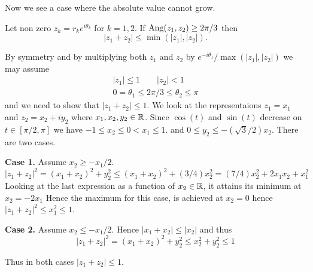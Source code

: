 Now we see a case where the absolute value cannot grow.
\begin{llem} \label{llem:z12:2pi3}
Let non zero \(z_k = r_k e^{i\theta_k}\) for \(k=1,2\).
If \(\mathop{\rm Ang}\nolimits(z_1,z_2) \geq 2\pi/3\) then
\begin{equation*}
|z_1 + z_2| \leq \min(|z_1|,|z_2|).
\end{equation*}
\end{llem}
\begin{thmproof}
By symmetry and by multiplying both \(z_1\) and \(z_2\) by 
\(e^{-i\theta_1}/\max(|z_1|,|z_2|)\)
we may assume 
\begin{gather*}
|z_1| \leq 1 \qquad |z_2| < 1 \\
0=\theta_1 \leq 2\pi/3 \leq \theta_2 \leq \pi
\end{gather*}
and we need to show that \(|z_1 + z_2| \leq 1\).
We look at the representaions \(z_1=x_1\) and \(z_2 = x_2 + iy_2\)
where \(x_1,x_2,y_2\in\mathbb{R}\).
Since \(\cos(t)\) and \(\sin(t)\) decrease on \(t\in[\pi/2,\pi]\)
we have 
\(-1 \leq x_2 \leq 0 < x_1 \leq 1\).
and
\(0\leq y_2 \leq -(\sqrt{3}/2)x_2\).
There are two cases.

\textbf{Case 1.} Assume \(x_2\geq -x_1/2\).
\begin{equation*}
|z_1 + z_2|^2
 = (x_1 + x_2)^2 + y_2^2 
 \leq (x_1 + x_2)^2 + (3/4)x_2^2 
 = (7/4)x_2^2 + 2x_1x_2 + x_1^2
\end{equation*}
Looking at the last expression as a function of \(x_2\in\mathbb{R}\),
it attains its minimum at \(x_2 = -2x_1\)
Hence the maximum for this case, is achieved at \(x_2 = 0\)
hence \(|z_1 + z_2|^2 \leq x_1^2 \leq 1\).

\textbf{Case 2.} Assume \(x_2\leq -x_1/2\).
Hence \(|x_1 + x_2| \leq |x_2|\) and thus
\begin{equation*}
|z_1 + z_2|^2
 = (x_1 + x_2)^2 + y_2^2 
 \leq x_2^2 + y_2^2 \leq 1
\end{equation*}

Thus in both cases \(|z_1 + z_2| \leq 1\).
\end{thmproof}


